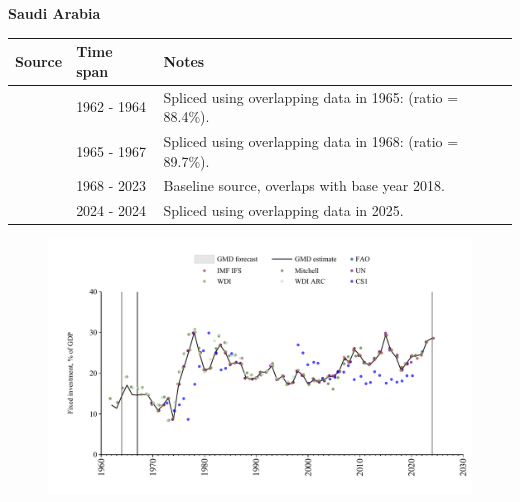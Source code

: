 \documentclass[12pt,a4paper,landscape]{article}
\begin{document}
\begin{adjustbox}{max totalsize={\paperwidth}{\paperheight},center}
\begin{minipage}[t][\textheight][t]{\textwidth}
\vspace*{0.5cm}
{}
\begin{center}
{\Large\bfseries Saudi Arabia}
\end{center}
\vspace{0.5cm}
\begin{table}[H]
\centering
\small
\begin{tabular}{|l|l|l|}
\hline
\textbf{Source} & \textbf{Time span} & \textbf{Notes} \\
\hline
\rowcolor{white}\cite{Mitchell}& 1962 - 1964 &Spliced using overlapping data in 1965: (ratio = 88.4\%).\\
\rowcolor{lightgray}\cite{WDI_ARC}& 1965 - 1967 &Spliced using overlapping data in 1968: (ratio = 89.7\%).\\
\rowcolor{white}\cite{WDI}& 1968 - 2023 &Baseline source, overlaps with base year 2018.\\
\rowcolor{lightgray}\cite{IMF_IFS}& 2024 - 2024 &Spliced using overlapping data in 2025.\\
\hline
\end{tabular}
\end{table}
\begin{figure}[H]
\centering
\includegraphics[width=\textwidth,height=0.6\textheight,keepaspectratio]{graphs/SAU_finv_GDP.pdf}
\end{figure}
\end{minipage}
\end{adjustbox}
\end{document}
